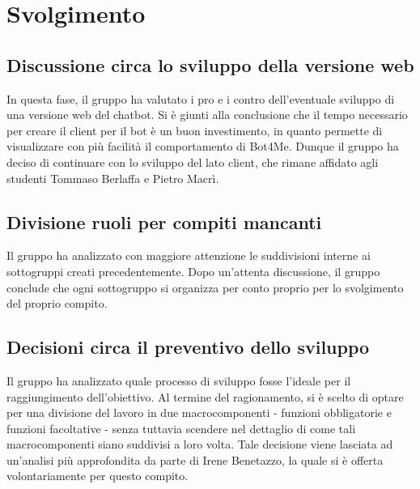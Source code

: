 \section{Svolgimento}
\subsection{Discussione circa lo sviluppo della versione web}
In questa fase, il gruppo ha valutato i pro e i contro dell'eventuale sviluppo di una versione web del chatbot. \newline
Si è giunti alla conclusione che il tempo necessario per creare il client per il bot è un buon investimento, in quanto permette di visualizzare con più facilità il comportamento di Bot4Me.
Dunque il gruppo ha deciso di continuare con lo sviluppo del lato client, che rimane affidato agli studenti Tommaso Berlaffa e Pietro Macrì.

\subsection{Divisione ruoli per compiti mancanti}
Il gruppo ha analizzato con maggiore attenzione le suddivisioni interne ai sottogruppi creati precedentemente. \newline
Dopo un'attenta discussione, il gruppo conclude che ogni sottogruppo si organizza per conto proprio per lo svolgimento del proprio compito.

\subsection{Decisioni circa il preventivo dello sviluppo}
Il gruppo ha analizzato quale processo di sviluppo fosse l'ideale per il raggiungimento dell'obiettivo. \newline
Al termine del ragionamento, si è scelto di optare per una divisione del lavoro in due macrocomponenti -
funzioni obbligatorie e funzioni facoltative - senza tuttavia scendere nel dettaglio di come tali macrocomponenti
siano suddivisi a loro volta. Tale decisione viene lasciata ad un'analisi più approfondita da parte di Irene
Benetazzo, la quale si è offerta volontariamente per questo compito.

\newpage